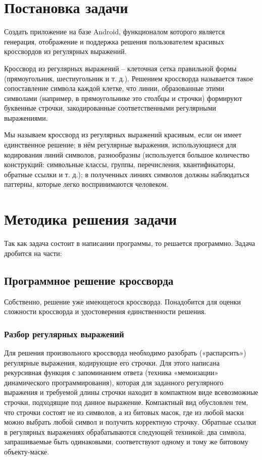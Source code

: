 \documentclass[12pt]{report}
\begin{document}
    \newpage %
   \chapter{Постановка задачи}

   Создать приложение на базе Android, функционалом которого является генерация, отображение и поддержка решения пользователем красивых кроссвордов из регулярных выражений.

   Кроссворд из регулярных выражений -- клеточная сетка правильной формы (прямоугольник, шестиугольник и т. д.). Решением кроссворда называется такое сопоставление символа каждой клетке, что линии, образованные этими символами (например, в прямоугольнике это столбцы и строчки) формируют буквенные строчки, закодированные соответственными регулярными выражениями.

   Мы называем кроссворд из регулярных выражений красивым, если он имеет единственное решение; в нём регулярные выражения, использующиеся для кодирования линий символов, разнообразны (используется большое количество конструкций: символьные классы, группы, перечисления, квантификаторы, обратные ссылки и т. д.); в полученных линиях символов должны наблюдаться паттерны, которые легко воспринимаются человеком.


    \newpage %
\chapter{Методика решения задачи}

Так как задача состоит в написании программы, то решается программно. Задача дробится на части:
\section{Программное решение кроссворда}
Собственно, решение уже имеющегося кроссворда. Понадобится для оценки сложности кроссворда и удостоверения единственности решения.

\subsection{Разбор регулярных выражений} Для решения произвольного кроссворда необходимо разобрать («распарсить») регулярные выражения, кодирующие его строчки. Для этого написана рекурсивная функция с запоминанием ответа (техника «мемоизации» динамического программирования), которая для заданного регулярного выражения и требуемой длины строчки находит в компактном виде всевозможные строчки, подходящие под данное выражение. Компактный вид обусловлен тем, что строчки состоят не из символов, а из битовых масок, где из любой маски можно выбрать любой символ и получить корректную строчку. Обратные ссылки в регулярных выражениях обрабатываются следующей техникой: два символа, запрашиваемые быть одинаковыми, соответствуют одному и тому же битовому объекту-маске.
\end{document}
